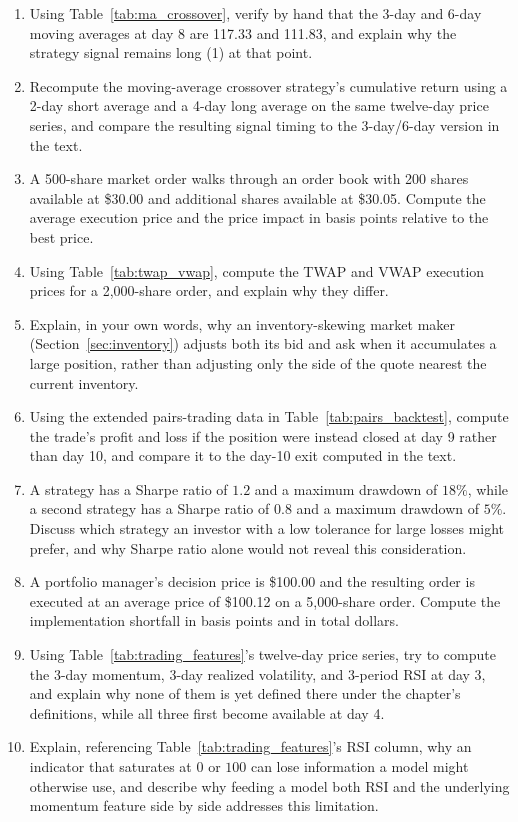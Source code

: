 \documentclass[../ai_in_finance]{subfiles}
\begin{document}
\begin{enumerate}[exercises]
    \item Using Table~\ref{tab:ma_crossover}, verify by hand that the 3-day and 6-day moving averages at day 8 are 117.33 and 111.83, and explain why the strategy signal remains long (1) at that point.
    \item Recompute the moving-average crossover strategy's cumulative return using a 2-day short average and a 4-day long average on the same twelve-day price series, and compare the resulting signal timing to the 3-day/6-day version in the text.
    \item A 500-share market order walks through an order book with 200 shares available at \$30.00 and additional shares available at \$30.05. Compute the average execution price and the price impact in basis points relative to the best price.
    \item Using Table~\ref{tab:twap_vwap}, compute the TWAP and VWAP execution prices for a 2,000-share order, and explain why they differ.
    \item Explain, in your own words, why an inventory-skewing market maker (Section~\ref{sec:inventory}) adjusts both its bid and ask when it accumulates a large position, rather than adjusting only the side of the quote nearest the current inventory.
    \item Using the extended pairs-trading data in Table~\ref{tab:pairs_backtest}, compute the trade's profit and loss if the position were instead closed at day 9 rather than day 10, and compare it to the day-10 exit computed in the text.
    \item A strategy has a Sharpe ratio of $1.2$ and a maximum drawdown of $18\%$, while a second strategy has a Sharpe ratio of $0.8$ and a maximum drawdown of $5\%$. Discuss which strategy an investor with a low tolerance for large losses might prefer, and why Sharpe ratio alone would not reveal this consideration.
    \item A portfolio manager's decision price is \$100.00 and the resulting order is executed at an average price of \$100.12 on a 5,000-share order. Compute the implementation shortfall in basis points and in total dollars.
    \item Using Table~\ref{tab:trading_features}'s twelve-day price series, try to compute the 3-day momentum, 3-day realized volatility, and 3-period RSI at day 3, and explain why none of them is yet defined there under the chapter's definitions, while all three first become available at day 4.
    \item Explain, referencing Table~\ref{tab:trading_features}'s RSI column, why an indicator that saturates at $0$ or $100$ can lose information a model might otherwise use, and describe why feeding a model both RSI and the underlying momentum feature side by side addresses this limitation.

\end{enumerate}
\end{document}
